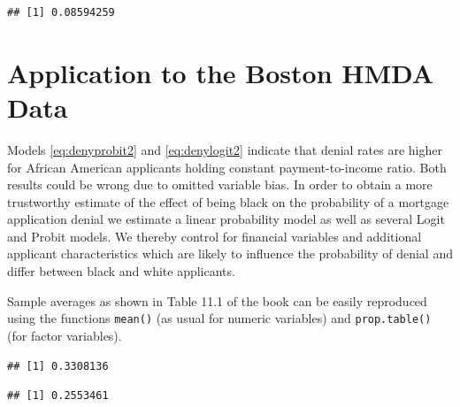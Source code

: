 \documentclass[]{book}
\newenvironment{Shaded}{\begin{snugshade}}{\end{snugshade}}
\newcommand{\KeywordTok}[1]{\textcolor[rgb]{0.13,0.29,0.53}{\textbf{#1}}}
\newcommand{\CommentTok}[1]{\textcolor[rgb]{0.56,0.35,0.01}{\textit{#1}}}
\newcommand{\OperatorTok}[1]{\textcolor[rgb]{0.81,0.36,0.00}{\textbf{#1}}}
\newcommand{\NormalTok}[1]{#1}
\theoremstyle{definition}
\theoremstyle{definition}
\theoremstyle{definition}
\theoremstyle{remark}
\begin{document}
\begin{verbatim}
## [1] 0.08594259
\end{verbatim}

\section{Application to the Boston HMDA
Data}\label{application-to-the-boston-hmda-data}

Models \eqref{eq:denyprobit2} and \eqref{eq:denylogit2} indicate that denial
rates are higher for African American applicants holding constant
payment-to-income ratio. Both results could be wrong due to omitted
variable bias. In order to obtain a more trustworthy estimate of the
effect of being black on the probability of a mortgage application
denial we estimate a linear probability model as well as several Logit
and Probit models. We thereby control for financial variables and
additional applicant characteristics which are likely to influence the
probability of denial and differ between black and white applicants.

Sample averages as shown in Table 11.1 of the book can be easily
reproduced using the functions \texttt{mean()} (as usual for numeric
variables) and \texttt{prop.table()} (for factor variables).

\begin{Shaded}
\end{Shaded}

\begin{verbatim}
## [1] 0.3308136
\end{verbatim}

\begin{Shaded}
\end{Shaded}

\begin{verbatim}
## [1] 0.2553461
\end{verbatim}

\begin{Shaded}
\end{Shaded}
\end{document}
